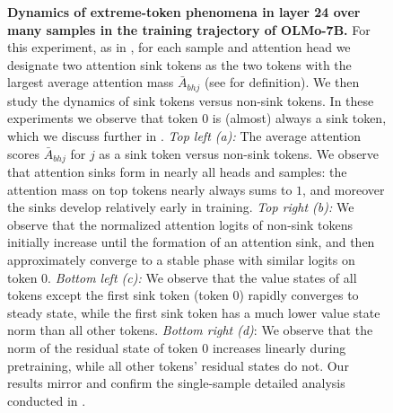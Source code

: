 \begin{figure}
    \caption{\small \textbf{Dynamics of extreme-token phenomena in layer 24 over many samples in the training trajectory of OLMo-7B.} For this experiment, as in , for each sample and attention head we designate two attention sink tokens as the two tokens with the largest average attention mass \(\bar{A}_{bhj}\) (see  for definition). We then study the dynamics of sink tokens versus non-sink tokens. In these experiments we observe that token \(0\) is (almost) always a sink token, which we discuss further in . \textit{Top left (a):} The average attention scores \(\bar{A}_{bhj}\) for \(j\) as a sink token versus non-sink tokens. We observe that attention sinks form in nearly all heads and samples: the attention mass on top tokens nearly always sums to \(1\), and moreover the sinks develop relatively early in training. \textit{Top right (b):} We observe that the normalized attention logits of non-sink tokens initially increase until the formation of an attention sink, and then approximately converge to a stable phase with similar logits on token \(0\). \textit{Bottom left (c):} We observe that the value states of all tokens except the first sink token (token \(0\)) rapidly converges to steady state, while the first sink token has a much lower value state norm than all other tokens. \textit{Bottom right (d)}: We observe that the norm of the residual state of token \(0\) increases linearly during pretraining, while all other tokens' residual states do not. Our results mirror and confirm the single-sample detailed analysis conducted in .}
    \label{fig:extreme_tokens_olmo_many_samples}
\end{figure}
